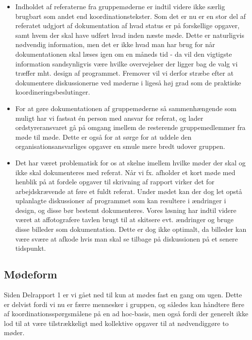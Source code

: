 \documentclass[10pt,a4paper,danish]{article}
\begin{document}
\begin{itemize}
\item Indholdet af referaterne fra gruppemøderne er indtil videre ikke særlig brugbart som andet end koordinationstekster. Som det er nu er en stor del af referatet udgjort af dokumentation af hvad status er på forskellige opgaver, samt hvem der skal have udført hvad inden næste møde. Dette er naturligvis nødvendig information, men det er ikke hvad man har brug for når dokumentationen skal læses igen om en måneds tid - da vil den vigtigste information sandsynligvis være hvilke overvejelser der ligger bag de valg vi træffer mht. design af programmet. Fremover vil vi derfor stræbe efter at dokumentere diskussionerne ved møderne i ligeså høj grad som de praktiske koordineringsbeslutinger. 
\item For at gøre dokumentationen af gruppemøderne så sammenhængende som muligt har vi fastsat én person med ansvar for referat, og lader ordstyreransvaret gå på omgang imellem de resterende gruppemedlemmer fra møde til møde. Dette er også for at sørge for at uddele den organisationsansvarliges opgaver en smule mere bredt udover gruppen. 
\item Det har været problematisk for os at skelne imellem hvilke møder der skal og ikke skal dokumenteres med referat. Når vi fx. afholder et kort møde med henblik på at fordele opgaver til skrivning af rapport virker det for arbejdskrævende at føre et fuldt referat. Under mødet kan der dog let opstå uplanlagte diskussioner af programmet som kan resultere i ændringer i design, og disse bør bestemt dokumenteres. Vores løsning har indtil videre været at affotografere tavlen brugt til at skitsere evt. ændringer og bruge disse billeder som dokumentation. Dette er dog ikke optimalt, da billeder kan være svære at afkode hvis man skal se tilbage på diskussionen på et senere tidspunkt. 
\end{itemize} 

\subsection{Mødeform}
Siden Delrapport 1 er vi gået ned til kun at mødes fast en gang om ugen. Dette er delvist fordi vi nu er færre mennesker i gruppen, og således kan håndtere flere af koordinationsspørgsmålene på en ad hoc-basis, men også fordi der generelt ikke lod til at være tilstrækkeligt med kollektive opgaver til at nødvendiggøre to møder. 
\end{document}
